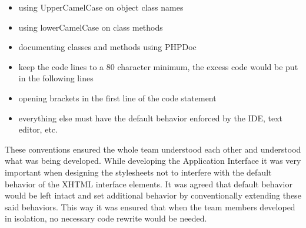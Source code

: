 \begin{itemize}
  \item using UpperCamelCase on object class names 
  \item using lowerCamelCase on class methods
  \item documenting classes and methods using PHPDoc
  \item keep the code lines to a 80 character minimum, the excess code would be
  put in the following lines 
  \item opening brackets in the first line of the code statement
  \item everything else must have the default behavior enforced by the IDE, text
  editor, etc.
\end{itemize}

These conventions ensured the whole team understood each other and understood
what was being developed. While developing the Application Interface it was very
important when designing the stylesheets not to interfere with the default
behavior of the XHTML interface elements. It was agreed that default behavior
would be left intact and set additional behavior by conventionally extending
these said behaviors. This way it was ensured that when the team members
developed in isolation, no necessary code rewrite would be needed.
